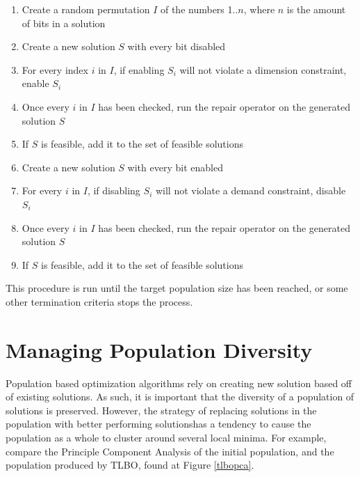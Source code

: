 \documentclass[11pt, letterpaper, onecolumn]{article}
\begin{document}
\begin{enumerate}
\item Create a random permutation $I$ of the numbers 1..$n$, where $n$ is the amount of bits in a solution
\item Create a new solution $S$ with every bit disabled
\item For every index $i$ in $I$, if enabling $S_i$ will not violate a dimension constraint, enable $S_i$
\item Once every $i$ in $I$ has been checked, run the repair operator on the generated solution $S$
\item If $S$ is feasible, add it to the set of feasible solutions
\item Create a new solution $S$ with every bit enabled
\item For every $i$ in $I$, if disabling $S_i$ will not violate a demand constraint, disable $S_i$
\item Once every $i$ in $I$ has been checked, run the repair operator on the generated solution $S$
\item If $S$ is feasible, add it to the set of feasible solutions
\end{enumerate}

This procedure is run until the target population size has been reached, or some other termination criteria stops the process. 

\section{Managing Population Diversity}

Population based optimization algorithms rely on creating new solution based off of existing solutions. As such, it is important that the diversity of a population of solutions is preserved. However, the strategy of replacing solutions in the population with better performing solutionshas a tendency to cause the population as a whole to cluster around several local minima. For example, compare the Principle Component Analysis of the initial population, and the population produced by TLBO, found at Figure \ref{tlbopca}.
\end{document}
